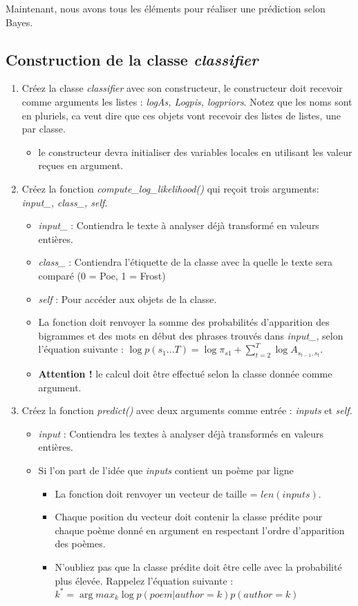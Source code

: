 Maintenant, nous avons tous les éléments pour réaliser une prédiction selon Bayes.

\subsection{Construction de la classe \textit{classifier}}

\begin{enumerate}
	\item Créez la classe \textit{classifier} avec son constructeur, le constructeur doit recevoir comme arguments les listes : \textit{logAs, Logpis, logpriors}. Notez que les noms sont en pluriels, ca veut dire que ces objets vont recevoir des listes de listes, une par classe.
	\begin{itemize}
		\item le constructeur devra initialiser des variables locales en utilisant les valeur reçues en argument.
	\end{itemize}
	\item Créez la fonction \textit{compute\_log\_likelihood()} qui reçoit trois arguments: \textit{input\_, class\_, self}.
	\begin{itemize}
		\item \textit{input\_} : Contiendra le texte à analyser déjà transformé en valeurs entières.
		\item \textit{class\_} : Contiendra l'étiquette de la classe avec la quelle le texte sera comparé (0 = Poe, 1 = Frost)
		\item \textit{self} : Pour accéder aux objets de la classe.
		\item La fonction doit renvoyer la somme des probabilités d'apparition des bigrammes et des mots en début des phrases trouvés dans \textit{input\_}, selon l'équation suivante : $\log p(s_1...T)=\log \pi_{s1}+\sum_{t=2}^{T}\log A_{s_{t-1},s_t}$.
		\item \textbf{Attention !} le calcul doit être effectué selon la classe donnée comme argument.
	\end{itemize}
	\item Créez la fonction \textit{predict()} avec deux arguments comme entrée : \textit{inputs} et \textit{self}.
	\begin{itemize}
		\item \textit{input} : Contiendra les textes à analyser déjà transformés en valeurs entières.
		\item Si l'on part de l'idée que \textit{inputs} contient un poème par ligne
		\begin{itemize}
			\item La fonction doit renvoyer un vecteur de taille = $len(inputs)$.
			\item Chaque position du vecteur doit contenir la classe prédite pour chaque poème donné en argument en respectant l'ordre d'apparition des poèmes.
			\item N'oubliez pas que la classe prédite doit être celle avec la probabilité plus élevée. Rappelez l'équation suivante :\\
			$k^* = \arg max_k \log p(poem | author = k) p(author = k)$
		\end{itemize}
	\end{itemize}
\end{enumerate}
